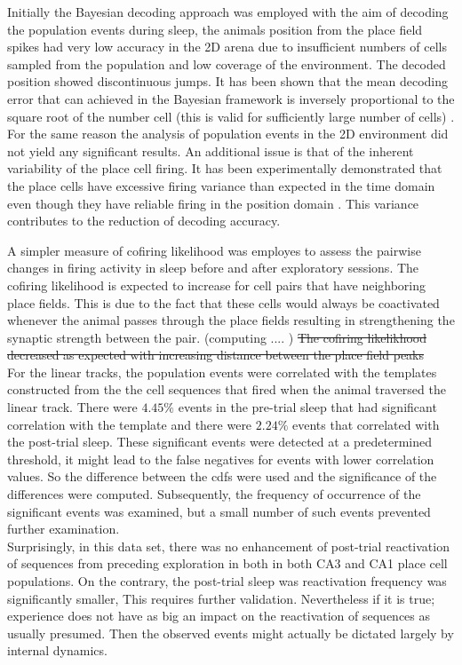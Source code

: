 Initially the Bayesian decoding approach was employed with the aim of decoding the population events during sleep, the animals position from the place field spikes had very low accuracy in the 2D arena due to insufficient numbers of cells sampled from the population and low coverage of the environment. The decoded position showed discontinuous jumps. It has been shown that the mean decoding error that can achieved in the Bayesian framework is inversely proportional to the square root of the number cell (this is valid for sufficiently large number of cells) \cite{Zhang2013}. For the same reason the analysis of population events in the 2D environment did not yield any significant results. An additional issue is that of the inherent variability of the place cell firing. It has been experimentally demonstrated that the place cells have excessive firing variance than expected in the time domain even though they have reliable firing in the position domain \cite{Fenton1998}. This variance contributes to the reduction of decoding accuracy.  

A simpler measure of cofiring likelihood was employes to assess the pairwise changes in firing activity in sleep before and after exploratory sessions. The cofiring likelihood is expected to increase for cell pairs that have neighboring place fields. This is due to the fact that these cells would always be coactivated whenever the animal passes through the place fields resulting in strengthening the synaptic strength between the pair. (computing .... ) 
\st{The cofiring likelikhood decreased as expected with increasing distance between the place field peaks }\\

For the linear tracks, the population events were correlated with the templates constructed from the the cell sequences that fired when the animal traversed the linear track. There were $4.45 \% $ events in the pre-trial sleep that had significant correlation with the template and there were $ 2.24 \% $  events that correlated with the post-trial sleep. These significant events were detected at a predetermined threshold, it might lead to the false negatives for events with lower correlation values. So the difference between the cdfs were used and the significance of the differences were computed. Subsequently, the frequency of occurrence of the significant events was examined, but a small number of such events prevented further examination.\\ Surprisingly, in this data set, there was no enhancement of post-trial reactivation of sequences from preceding exploration in both in both CA3 and CA1 place cell populations. On the contrary, the post-trial sleep was reactivation frequency was significantly smaller, This requires further validation. Nevertheless if it is true; experience does not have as big an impact on the reactivation of sequences as usually presumed. Then the observed events might actually be dictated largely by internal dynamics. 

